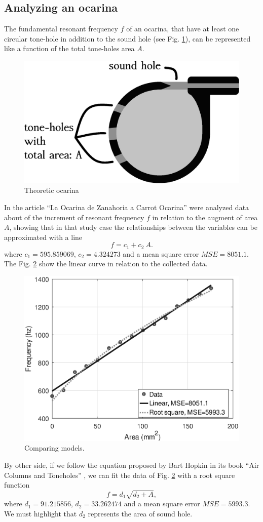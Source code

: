 \documentclass{article}
\begin{document}
\subsection{Analyzing an ocarina}

The fundamental resonant frequency $f$ of an ocarina, 
that have at least one circular tone-hole %
in addition to the sound hole (see Fig. \ref{fig:ocarina-teorica}),
can be represented like a function of the total tone-holes area $A$.


\begin{figure}[ht!]
\centering
\includegraphics[width=0.350\columnwidth]{ocarina-teorica.eps}
\caption{Theoretic ocarina}
\label{fig:ocarina-teorica}
\end{figure}

In the article ``La Ocarina de Zanahoria a Carrot Ocarina'' \cite{mp2010ocarina}
were analyzed data about of the increment of resonant frequency $f$ in relation to the augment of area $A$,
showing that in that study case the relationships between the variables can be approximated with a line 
\begin{equation}
f=c_1+ c_2~A.
\end{equation}
where $c_1=595.859069$, $c_2=4.324273$ and a mean square error $MSE=8051.1$.
The Fig. \ref{fig:models} show the linear curve in relation to the collected data.


\begin{figure}[ht!]
\centering
\includegraphics[width=0.50\columnwidth]{compara.eps}
\caption{Comparing models. }
\label{fig:models}
\end{figure}

By other side, 
if we follow the equation proposed by Bart Hopkin in its book ``Air Columns and Toneholes'' 
\cite[pp. 44]{cabreraestudio} \cite{1999air},
we can fit the data of Fig. \ref{fig:models} with a root square function
\begin{equation}
f=d_1\sqrt{d_2+A},
\end{equation}
where $d_1=91.215856$, $d_2=33.262474$ and a mean square error $MSE=5993.3$.
We must highlight that $d_2$ represents the area of sound hole. 
\end{document}
